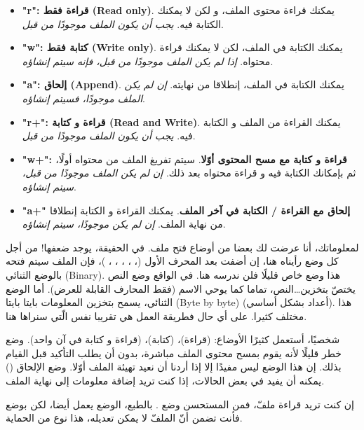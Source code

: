 \begin{itemize}
  \item \textbf{"\textenglish{r}":
قراءة فقط
(\textenglish{Read only})}.
يمكنك قراءة محتوى الملف، و لكن لا يمكنك الكتابة فيه.
\textit{يجب أن يكون الملف موجودًا من قبل}.
  \item \textbf{"\textenglish{w}":
كتابة فقط
(\textenglish{Write only})}.
يمكنك الكتابة في الملف، لكن لا يمكنك قراءة محتواه.
\textit{إذا لم يكن الملف موجودًا من قبل، فإنه سيتم إنشاؤه}.
  \item \textbf{"\textenglish{a}":
إلحاق
(\textenglish{Append})}.
يمكنك الكتابة في الملف، إنطلاقا من نهايته.
\textit{إن لم يكن الملف موجودًا، فسيتم إنشاؤه}.
  \item \textbf{"\textenglish{r+}":
قراءة و كتابة
(\textenglish{Read and Write})}.
يمكنك القراءة من الملف و الكتابة فيه.
\textit{يجب أن يكون الملف موجودًا من قبل}.
  \item \textbf{"\textenglish{w+}":
قراءة و كتابة مع مسح المحتوى أوّلا}.
سيتم تفريغ الملف من محتواه أولًا، ثم بإمكانك الكتابة فيه و قراءة محتواه بعد ذلك.
\textit{إن لم يكن الملف موجودًا من قبل، سيتم إنشاؤه}.
  \item \textbf{"\textenglish{a+}"
إلحاق مع القراءة / الكتابة في آخر الملف}.
يمكنك القراءة و الكتابة إنطلاقا من نهاية الملف.
\textit{إن لم يكن موجودًا، سيتم إنشاؤه}.
\end{itemize}

لمعلوماتك، أنا عرضت لك بعضا من أوضاع فتح ملف. في الحقيقة، يوجد ضعفها!
من أجل كل وضع رأيناه هنا، إن أضفت
بعد المحرف الأول
(، ، ، ، ، )،
فإن الملف سيتم فتحه بالوضع الثنائي
(\textenglish{Binary}).
هذا وضع خاص قليلًا فلن ندرسه هنا. في الواقع وضع النص يختصّ بتخزين\dots النص، تماما كما يوحي الاسم (فقط المحارف القابلة للعرض). أما الوضع الثنائي، يسمح بتخزين المعلومات
بايتا بايتا
(\textenglish{Byte by byte})
(أعداد بشكل أساسي). هذا مختلف كثيرا. على أي حال فطريقة العمل هي تقريبا نفس الّتي سنراها هنا.

شخصيًا، أستعمل كثيرًا الأوضاع:
(قراءة)،
(كتابة)،
(قراءة و كتابة في آن واحد). وضع
خطر قليلًا لأنه يقوم بمسح محتوى الملف مباشرة، بدون أن يطلب التأكيد قبل القيام بذلك. إن هذا الوضع ليس مفيدًا إلا إذا أردنا أن نعيد تهيئة الملف أوّلا.
وضع الإلحاق
()
يمكنه أن يفيد في بعض الحالات، إذا كنت تريد إضافة معلومات إلى نهاية الملف.

\begin{information}
  إن كنت تريد قراءة ملفّ، فمن المستحسن وضع
.
بالطبع، الوضع
يعمل أيضا، لكن بوضع
فأنت تضمن أنّ الملفّ لا يمكن تعديله، هذا نوع من الحماية.
\end{information}

